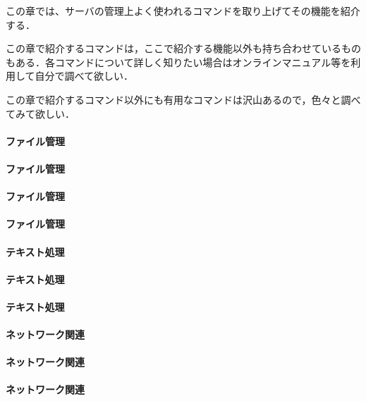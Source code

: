 この章では、サーバの管理上よく使われるコマンドを取り上げてその機能を紹介する．\par
この章で紹介するコマンドは，ここで紹介する機能以外も持ち合わせているものもある．各コマンドについて詳しく知りたい場合はオンラインマニュアル等を利用して自分で調べて欲しい．\par
この章で紹介するコマンド以外にも有用なコマンドは沢山あるので，色々と調べてみて欲しい．\par

\paragraph{ファイル管理}

\paragraph{ファイル管理}

\paragraph{ファイル管理}

\paragraph{ファイル管理}

\paragraph{テキスト処理}

\paragraph{テキスト処理}

\paragraph{テキスト処理}

\paragraph{ネットワーク関連}

\paragraph{ネットワーク関連}

\paragraph{ネットワーク関連}


